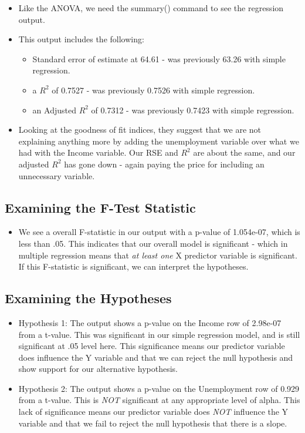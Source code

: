 \documentclass[
  letterpaper,
  DIV=11,
  numbers=noendperiod]{scrreprt}
\providecommand{\tightlist}{%
  \setlength{\itemsep}{0pt}\setlength{\parskip}{0pt}}\usepackage{longtable,booktabs,array}
\begin{document}
\begin{itemize}
\tightlist
\item
  Like the ANOVA, we need the summary() command to see the regression
  output.
\item
  This output includes the following:

  \begin{itemize}
  \tightlist
  \item
    Standard error of estimate at 64.61 - was previously 63.26 with
    simple regression.
  \item
    a \(R^2\) of 0.7527 - was previously 0.7526 with simple regression.
  \item
    an Adjusted \(R^2\) of 0.7312 - was previously 0.7423 with simple
    regression.
  \end{itemize}
\item
  Looking at the goodness of fit indices, they suggest that we are not
  explaining anything more by adding the unemployment variable over what
  we had with the Income variable. Our RSE and \(R^2\) are about the
  same, and our adjusted \(R^2\) has gone down - again paying the price
  for including an unnecessary variable.
\end{itemize}

\subsection{Examining the F-Test
Statistic}\label{examining-the-f-test-statistic-1}

\begin{itemize}
\tightlist
\item
  We see a overall F-statistic in our output with a p-value of
  1.054e-07, which is less than .05. This indicates that our overall
  model is significant - which in multiple regression means that
  \emph{at least one} X predictor variable is significant. If this
  F-statistic is significant, we can interpret the hypotheses.
\end{itemize}

\subsection{Examining the Hypotheses}\label{examining-the-hypotheses}

\begin{itemize}
\tightlist
\item
  Hypothesis 1: The output shows a p-value on the Income row of 2.98e-07
  from a t-value. This was significant in our simple regression model,
  and is still significant at .05 level here. This significance means
  our predictor variable does influence the Y variable and that we can
  reject the null hypothesis and show support for our alternative
  hypothesis.
\item
  Hypothesis 2: The output shows a p-value on the Unemployment row of
  0.929 from a t-value. This is \emph{NOT} significant at any
  appropriate level of alpha. This lack of significance means our
  predictor variable does \emph{NOT} influence the Y variable and that
  we fail to reject the null hypothesis that there is a slope.
\end{itemize}
\end{document}
